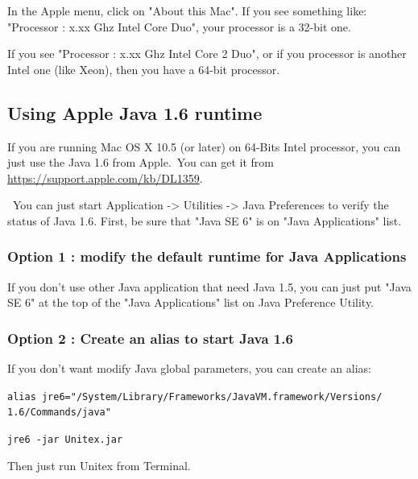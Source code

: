 \noindent In the Apple menu, click on "About this Mac". If you see something
like: "Processor : x.xx Ghz Intel Core Duo", your processor is a 32-bit one.

\bigskip
\noindent If you see "Processor : x.xx Ghz Intel Core 2 Duo", or if you
processor is another Intel one (like Xeon), then you have a 64-bit processor.

\subsection{Using Apple Java 1.6 runtime}
\bigskip{}
\noindent If you are running Mac OS X 10.5 (or later) on 64-Bits Intel processor, you can just use the Java 1.6 from Apple.\ You can get it from \url{https://support.apple.com/kb/DL1359}.

\noindent\ You can just start Application -> Utilities -> Java Preferences to verify the status of Java 1.6. First, be sure that "Java SE 6" is on "Java Applications" list.

\subsubsection{Option 1 : modify the default runtime for Java Applications}
\noindent If you don't use other Java application that need Java 1.5, you can just put "Java SE 6" at the top of the "Java Applications" list on Java Preference Utility.

\subsubsection{Option 2 : Create an alias to start Java 1.6}
\noindent If you don't want modify Java global parameters, you can create an
alias:

\bigskip
\noindent \verb+alias jre6="/System/Library/Frameworks/JavaVM.framework/Versions/+
\noindent \verb+1.6/Commands/java"+
   
\bigskip
\noindent \verb+jre6 -jar Unitex.jar+

\bigskip
\noindent Then just run Unitex from Terminal.





